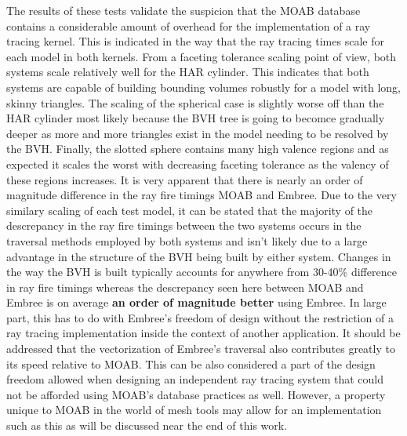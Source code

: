 \documentclass[10pt, a4paper]{article}
\begin{document}
The results of these tests validate the suspicion that the MOAB database contains a considerable amount of overhead for the implementation of a ray tracing kernel. This is indicated in the way that the ray tracing times scale for each model in both kernels. From a faceting tolerance scaling point of view, both systems scale relatively well for the HAR cylinder. This indicates that both systems are capable of building bounding volumes robustly for a model with long, skinny triangles. The scaling of the spherical case is slightly worse off than the HAR cylinder most likely because the BVH tree is going to becomce gradually deeper as more and more triangles exist in the model needing to be resolved by the BVH. Finally, the slotted sphere contains many high valence regions and as expected it scales the worst with decreasing faceting tolerance as the valency of these regions increases. It is very apparent that there is nearly an order of magnitude difference in the ray fire timings MOAB and Embree. Due to the very similary scaling of each test model, it can be stated that the majority of the descrepancy in the ray fire timings between the two systems occurs in the traversal methods employed by both systems and isn't likely due to a large advantage in the structure of the BVH being built by either system. Changes in the way the BVH is built typically accounts for anywhere from 30-40\% difference in ray fire timings whereas the descrepancy seen here between MOAB and Embree is on average \textbf{an order of magnitude better} using Embree. In large part, this has to do with Embree's freedom of design without the restriction of a ray tracing implementation inside the context of another application. It should be addressed that the vectorization of Embree's traversal also contributes greatly to its speed relative to MOAB. This can be also considered a part of the design freedom allowed when designing an independent ray tracing system that could not be afforded using MOAB's database practices as well. However, a property unique to MOAB in the world of mesh tools may allow for an implementation such as this as will be discussed near the end of this work.
\end{document}
